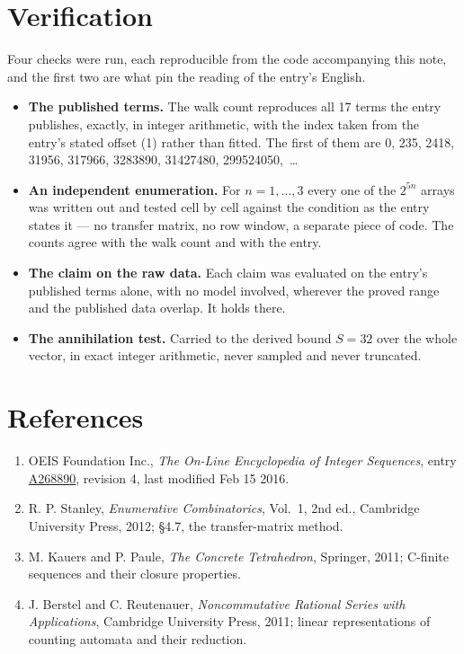 \documentclass[11pt]{article}
\theoremstyle{definition}
\begin{document}
\section{Verification}

Four checks were run, each reproducible from the code accompanying this note, and the first two are what pin the reading of the entry's English.

\begin{itemize}

\item {\bfseries The published terms.} The walk count reproduces all 17 terms the entry publishes, exactly, in integer arithmetic, with the index taken from the entry's stated offset (1) rather than fitted. The first of them are 0, 235, 2418, 31956, 317966, 3283890, 31427480, 299524050,~\dots

\item {\bfseries An independent enumeration.} For $n = 1,\dots,3$ every one of the $2^{5n}$ arrays was written out and tested cell by cell against the condition as the entry states it --- no transfer matrix, no row window, a separate piece of code. The counts agree with the walk count and with the entry.

\item {\bfseries The claim on the raw data.} Each claim was evaluated on the entry's published terms alone, with no model involved, wherever the proved range and the published data overlap. It holds there.

\item {\bfseries The annihilation test.} Carried to the derived bound $S = 32$ over the whole vector, in exact integer arithmetic, never sampled and never truncated.

\end{itemize}

\section{References}

\begin{enumerate}

\item OEIS Foundation Inc., \emph{The On-Line Encyclopedia of Integer Sequences}, entry \href{https://oeis.org/A268890}{A268890}, revision 4, last modified Feb 15 2016.

\item R. P. Stanley, \emph{Enumerative Combinatorics}, Vol.~1, 2nd ed., Cambridge University Press, 2012; \S4.7, the transfer-matrix method.

\item M. Kauers and P. Paule, \emph{The Concrete Tetrahedron}, Springer, 2011; C-finite sequences and their closure properties.

\item J. Berstel and C. Reutenauer, \emph{Noncommutative Rational Series with Applications}, Cambridge University Press, 2011; linear representations of counting automata and their reduction.

\end{enumerate}
\end{document}
